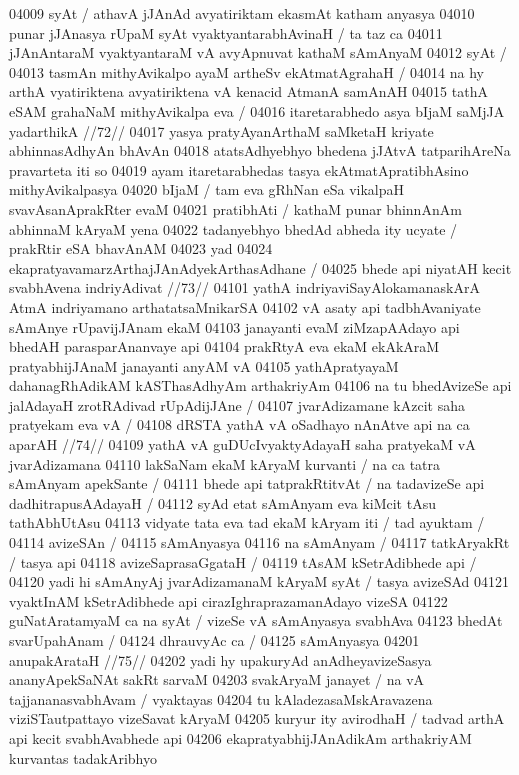 04009 syAt / athavA jJAnAd avyatiriktam ekasmAt katham anyasya 
04010 punar jJAnasya rUpaM syAt vyaktyantarabhAvinaH / ta taz ca 
04011 jJAnAntaraM vyaktyantaraM vA avyApnuvat kathaM sAmAnyaM  
04012 syAt / 
04013 	tasmAn mithyAvikalpo ayaM artheSv ekAtmatAgrahaH / 
04014 na hy arthA vyatiriktena avyatiriktena vA kenacid AtmanA samAnAH 
04015 tathA eSAM grahaNaM mithyAvikalpa eva / 
04016 	itaretarabhedo asya bIjaM saMjJA yadarthikA //72//  
04017 yasya pratyAyanArthaM saMketaH kriyate abhinnasAdhyAn bhAvAn
04018 atatsAdhyebhyo bhedena jJAtvA tatparihAreNa pravarteta iti so 
04019 ayam itaretarabhedas tasya ekAtmatApratibhAsino mithyAvikalpasya
04020 bIjaM / tam eva gRhNan eSa vikalpaH svavAsanAprakRter evaM  
04021 pratibhAti / kathaM punar bhinnAnAm abhinnaM kAryaM yena  
04022 tadanyebhyo bhedAd abheda ity ucyate / prakRtir eSA bhavAnAM
04023 yad  
04024 	ekapratyavamarzArthajJAnAdyekArthasAdhane / 
04025 	bhede api niyatAH kecit svabhAvena indriyAdivat //73//
04101 yathA indriyaviSayAlokamanaskArA AtmA indriyamano arthatatsaMnikarSA
04102 vA asaty api tadbhAvaniyate sAmAnye rUpavijJAnam ekaM
04103 janayanti evaM ziMzapAAdayo api bhedAH parasparAnanvaye api
04104 prakRtyA eva ekaM ekAkAraM pratyabhijJAnaM janayanti anyAM vA  
04105 yathApratyayaM dahanagRhAdikAM kASThasAdhyAm arthakriyAm  
04106 na tu bhedAvizeSe api jalAdayaH zrotRAdivad rUpAdijJAne /
04107 	jvarAdizamane kAzcit saha pratyekam eva vA / 
04108 	dRSTA yathA vA oSadhayo nAnAtve api na ca aparAH //74//  
04109 yathA vA guDUcIvyaktyAdayaH saha pratyekaM vA jvarAdizamana  
04110 lakSaNam ekaM kAryaM kurvanti / na ca tatra sAmAnyam apekSante / 
04111 bhede api tatprakRtitvAt / na tadavizeSe api dadhitrapusAAdayaH / 
04112 syAd etat sAmAnyam eva kiMcit tAsu tathAbhUtAsu  
04113 vidyate tata eva tad ekaM kAryam iti / tad ayuktam /
04114 	avizeSAn /
04115 sAmAnyasya  
04116 	na sAmAnyam /  
04117 tatkAryakRt / tasya api
04118 	avizeSaprasaGgataH /
04119 	tAsAM kSetrAdibhede api / 
04120 yadi hi sAmAnyAj jvarAdizamanaM kAryaM syAt / tasya avizeSAd 
04121 vyaktInAM kSetrAdibhede api cirazIghraprazamanAdayo vizeSA
04122 guNatAratamyaM ca na syAt / vizeSe vA sAmAnyasya svabhAva
04123 bhedAt svarUpahAnam / 
04124 	dhrauvyAc ca /  
04125 sAmAnyasya  
04201 	anupakArataH //75// 
04202 yadi hy upakuryAd anAdheyavizeSasya ananyApekSaNAt sakRt sarvaM
04203 svakAryaM janayet / na vA tajjananasvabhAvam / vyaktayas
04204 tu kAladezasaMskAravazena viziSTautpattayo vizeSavat kAryaM 
04205 kuryur ity avirodhaH / tadvad arthA api kecit svabhAvabhede api  
04206 ekapratyabhijJAnAdikAm arthakriyAM kurvantas tadakAribhyo  

